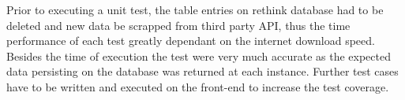 Prior to executing a unit test, the table entries on rethink database had to be deleted and new data be scrapped from third party API, thus the time performance of each test greatly dependant on the internet download speed. Besides the time of execution the test were very much accurate as the expected data persisting on the database was returned at each instance. Further test cases have to be written and executed on the front-end to increase the test coverage.